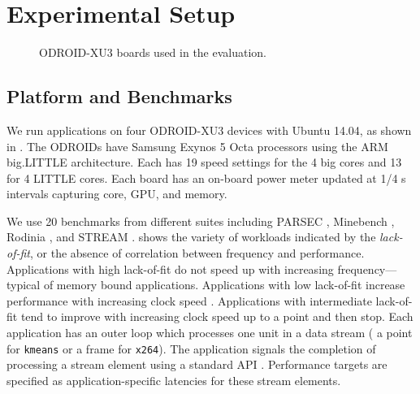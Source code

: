 \section{Experimental Setup}
\begin{figure}[t]
 \caption{ODROID-XU3 boards used in the evaluation.}
 \label{fig:odroidall}
\end{figure}

\subsection{Platform and Benchmarks}
We run applications on four ODROID-XU3 devices with Ubuntu 14.04, as
shown in . The ODROIDs have Samsung Exynos 5
Octa processors using the ARM big.LITTLE architecture.  Each has 19
speed settings for the 4 big cores and 13 for 4 LITTLE cores.  Each
board has an on-board power meter updated at 1/4 s intervals capturing
core, GPU, and memory.

We use 20 benchmarks from different suites including PARSEC
\cite{parsec}, Minebench \cite{minebench}, Rodinia \cite{rodinia}, and
STREAM \cite{stream}.  shows the
variety of workloads indicated by the \emph{lack-of-fit}, or the
absence of correlation between frequency and performance.
Applications with high lack-of-fit do not speed up with increasing
frequency---typical of memory bound applications. Applications with
low lack-of-fit increase performance with increasing clock speed
\cite{powerslope}.  Applications with intermediate lack-of-fit tend to
improve with increasing clock speed up to a point and then stop.  Each
application has an outer loop which processes one unit in a data
stream (\eg{} a point for \texttt{kmeans} or a frame for
\texttt{x264}). The application signals the completion of processing a
stream element using a standard API \cite{icac2010heartbeats}.
Performance targets are specified as application-specific latencies
for these stream elements.




